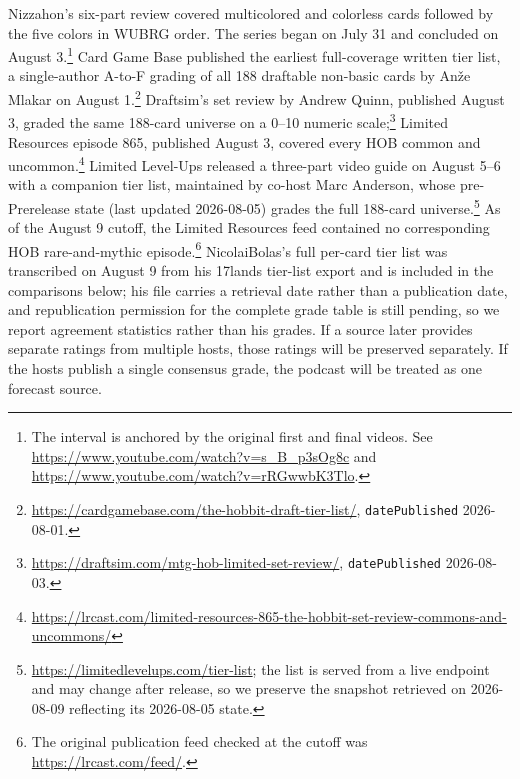 \documentclass[11pt]{article}
\numberwithin{equation}{section}
\begin{document}
Nizzahon's six-part review covered multicolored and colorless cards followed by the five colors in WUBRG order. The series began on July 31 and concluded on August 3.\footnote{The interval is anchored by the original first and final videos. See \url{https://www.youtube.com/watch?v=s_B_p3sOg8c} and \url{https://www.youtube.com/watch?v=rRGwwbK3Tlo}.} Card Game Base published the earliest full-coverage written tier list, a single-author A-to-F grading of all 188 draftable non-basic cards by An\v{z}e Mlakar on August 1.\footnote{\url{https://cardgamebase.com/the-hobbit-draft-tier-list/}, \texttt{datePublished} 2026-08-01.} Draftsim's set review by Andrew Quinn, published August 3, graded the same 188-card universe on a 0--10 numeric scale;\footnote{\url{https://draftsim.com/mtg-hob-limited-set-review/}, \texttt{datePublished} 2026-08-03.} Limited Resources episode 865, published August 3, covered every HOB common and uncommon.\footnote{\url{https://lrcast.com/limited-resources-865-the-hobbit-set-review-commons-and-uncommons/}} Limited Level-Ups released a three-part video guide on August 5--6 with a companion tier list, maintained by co-host Marc Anderson, whose pre-Prerelease state (last updated 2026-08-05) grades the full 188-card universe.\footnote{\url{https://limitedlevelups.com/tier-list}; the list is served from a live endpoint and may change after release, so we preserve the snapshot retrieved on 2026-08-09 reflecting its 2026-08-05 state.} As of the August 9 cutoff, the Limited Resources feed contained no corresponding HOB rare-and-mythic episode.\footnote{The original publication feed checked at the cutoff was \url{https://lrcast.com/feed/}.} NicolaiBolas's full per-card tier list was transcribed on August 9 from his 17lands tier-list export and is included in the comparisons below; his file carries a retrieval date rather than a publication date, and republication permission for the complete grade table is still pending, so we report agreement statistics rather than his grades. If a source later provides separate ratings from multiple hosts, those ratings will be preserved separately. If the hosts publish a single consensus grade, the podcast will be treated as one forecast source.
\end{document}
